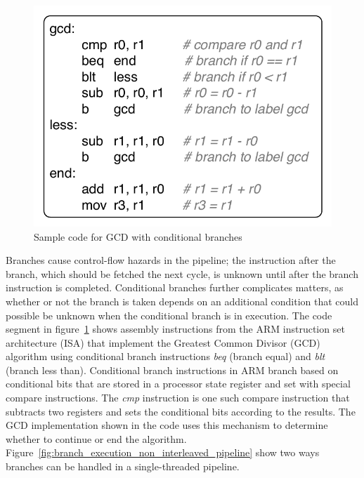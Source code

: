\begin{figure}
  \vspace{-20pt}
  \begin{center}
    \includegraphics[scale=.65]{figs/sample_gcd_code}
  \end{center}
  \vspace{-20pt}
  \caption{Sample code for GCD with conditional branches}
  \label{fig:sample_gcd_code}
\end{figure}
Branches cause control-flow hazards in the pipeline; the instruction after the branch, which should be fetched the next cycle, is unknown until after the branch instruction is completed.
Conditional branches further complicates matters, as whether or not the branch is taken depends on an additional condition that could possible be unknown when the conditional branch is in execution. 
The code segment in figure~\ref{fig:sample_gcd_code} shows assembly instructions from the ARM instruction set architecture (ISA) that implement the Greatest Common Divisor (GCD) algorithm using conditional branch instructions \emph{beq} (branch equal) and \emph{blt} (branch less than).  
Conditional branch instructions in ARM branch based on conditional bits that are stored in a processor state register and set with special compare instructions.
The \emph{cmp} instruction is one such compare instruction that subtracts two registers and sets the conditional bits according to the results.
The GCD implementation shown in the code uses this mechanism to determine whether to continue or end the algorithm.
Figure~\ref{fig:branch_execution_non_interleaved_pipeline} show two ways branches can be handled in a single-threaded pipeline. 

